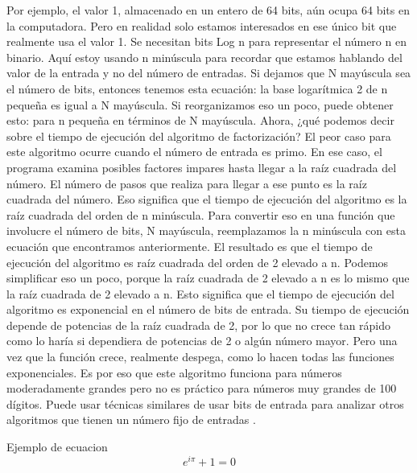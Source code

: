 \documentclass{article}
\begin{document}
Por ejemplo, el valor 1, almacenado en un entero de 64
bits, aún ocupa 64 bits en la computadora. Pero en realidad solo estamos
interesados en ese único bit que realmente usa el valor 1. Se necesitan bits
Log n para representar el número n en binario. Aquí estoy usando n minúscula
para recordar que estamos hablando del valor de la entrada y no del número de
entradas. Si dejamos que N mayúscula sea el número de bits, entonces tenemos
esta ecuación: la base logarítmica 2 de n pequeña es igual a N mayúscula. Si
reorganizamos eso un poco, puede obtener esto: para n pequeña en términos de N
mayúscula. Ahora, ¿qué podemos decir sobre el tiempo de ejecución del algoritmo
de factorización? El peor caso para este algoritmo ocurre cuando el número de
entrada es primo. En ese caso, el programa examina posibles factores impares
hasta llegar a la raíz cuadrada del número. El número de pasos que realiza para
llegar a ese punto es la raíz cuadrada del número. Eso significa que el tiempo
de ejecución del algoritmo es la raíz cuadrada del orden de n minúscula. Para
convertir eso en una función que involucre el número de bits, N mayúscula,
reemplazamos la n minúscula con esta ecuación que encontramos anteriormente. El
resultado es que el tiempo de ejecución del algoritmo es raíz cuadrada del orden
de 2 elevado a n. Podemos simplificar eso un poco, porque la raíz cuadrada de 2
elevado a n es lo mismo que la raíz cuadrada de 2 elevado a n. Esto significa
que el tiempo de ejecución del algoritmo es exponencial en el número de bits de
entrada. Su tiempo de ejecución depende de potencias de la raíz cuadrada de 2,
por lo que no crece tan rápido como lo haría si dependiera de potencias de 2 o
algún número mayor. Pero una vez que la función crece, realmente despega, como
lo hacen todas las funciones exponenciales. Es por eso que este algoritmo
funciona para números moderadamente grandes pero no es práctico para números muy
grandes de 100 dígitos. Puede usar técnicas similares de usar bits de entrada
para analizar otros algoritmos que tienen un número fijo de entradas \cite{stephens2015learning}.



 


Ejemplo de ecuacion
$$ e^{i\pi} + 1 = 0 $$
\end{document}
